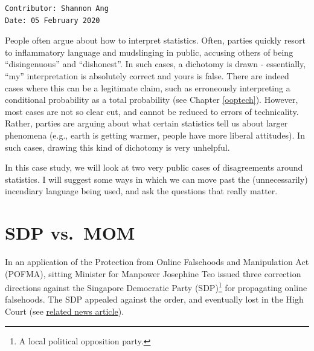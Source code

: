 \documentclass[openany]{book}
\let\rmarkdownfootnote\footnote%
\def\footnote{\protect\rmarkdownfootnote}
\begin{document}
\begin{verbatim}
Contributor: Shannon Ang
Date: 05 February 2020
\end{verbatim}

People often argue about how to interpret statistics. Often, parties
quickly resort to inflammatory language and mudslinging in public,
accusing others of being ``disingenuous'' and ``dishonest''. In such
cases, a dichotomy is drawn - essentially, ``my'' interpretation is
absolutely correct and yours is false. There are indeed cases where this
can be a legitimate claim, such as erroneously interpreting a
conditional probability as a total probability (see Chapter
\ref{ooptech}). However, most cases are not so clear cut, and cannot be
reduced to errors of technicality. Rather, parties are arguing about
what certain statistics tell us about larger phenomena (e.g., earth is
getting warmer, people have more liberal attitudes). In such cases,
drawing this kind of dichotomy is very unhelpful.

In this case study, we will look at two very public cases of
disagreements around statistics. I will suggest some ways in which we
can move past the (unnecessarily) incendiary language being used, and
ask the questions that really matter.

\section{SDP vs.~MOM}\label{pofmasdp}

In an application of the Protection from Online Falsehoods and
Manipulation Act (POFMA), sitting Minister for Manpower Josephine Teo
issued three correction directions against the Singapore Democratic
Party (SDP)\footnote{A local political opposition party.} for
propagating online falsehoods. The SDP appealed against the order, and
eventually lost in the High Court (see
\href{https://www.channelnewsasia.com/news/singapore/judge-dismisses-sdp-s-pofma-challenge-says-statements-were-false-12394932}{related
news article}).
\end{document}
